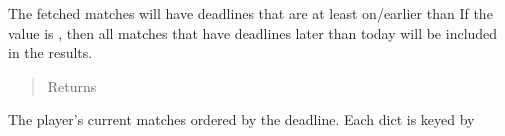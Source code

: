 \documentclass[letterpaper,10pt,english]{sphinxmanual}
\begin{document}
\begin{fulllineitems}
\begin{quote}
\begin{description}
\end{description}\end{quote}

The fetched matches will have deadlines that are at least on/earlier than 
If the value is , then all matches that have deadlines later than 
today will be included in the results.
\begin{quote}\begin{description}
\item[{Returns}] \leavevmode
{}

\end{description}\end{quote}

The player’s current matches ordered by the deadline. Each dict is keyed by 

\end{fulllineitems}

\end{document}
